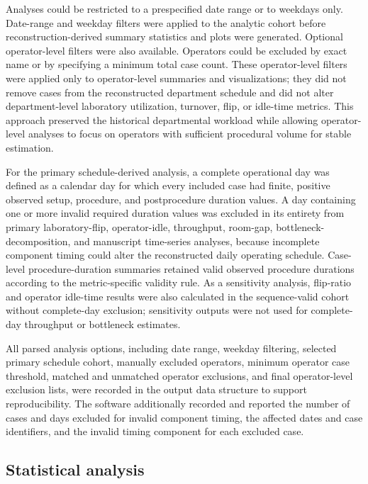 \documentclass[12pt]{article}
\begin{document}
Analyses could be restricted to a prespecified date range or to weekdays only. Date-range and weekday filters were applied to the analytic cohort before reconstruction-derived summary statistics and plots were generated. Optional operator-level filters were also available. Operators could be excluded by exact name or by specifying a minimum total case count. These operator-level filters were applied only to operator-level summaries and visualizations; they did not remove cases from the reconstructed department schedule and did not alter department-level laboratory utilization, turnover, flip, or idle-time metrics. This approach preserved the historical departmental workload while allowing operator-level analyses to focus on operators with sufficient procedural volume for stable estimation.

For the primary schedule-derived analysis, a complete operational day was defined as a calendar day for which every included case had finite, positive observed setup, procedure, and postprocedure duration values. A day containing one or more invalid required duration values was excluded in its entirety from primary laboratory-flip, operator-idle, throughput, room-gap, bottleneck-decomposition, and manuscript time-series analyses, because incomplete component timing could alter the reconstructed daily operating schedule. Case-level procedure-duration summaries retained valid observed procedure durations according to the metric-specific validity rule. As a sensitivity analysis, flip-ratio and operator idle-time results were also calculated in the sequence-valid cohort without complete-day exclusion; sensitivity outputs were not used for complete-day throughput or bottleneck estimates.

All parsed analysis options, including date range, weekday filtering, selected primary schedule cohort, manually excluded operators, minimum operator case threshold, matched and unmatched operator exclusions, and final operator-level exclusion lists, were recorded in the output data structure to support reproducibility. The software additionally recorded and reported the number of cases and days excluded for invalid component timing, the affected dates and case identifiers, and the invalid timing component for each excluded case.

\subsection{Statistical analysis}
\end{document}
